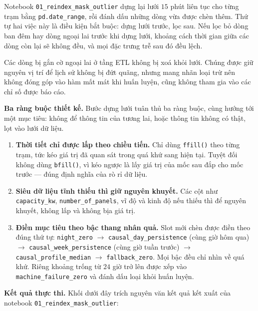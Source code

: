 Notebook \texttt{01\_reindex\_mask\_outlier} dựng lại lưới $15$ phút liên tục cho từng trạm
bằng \texttt{pd.date\_range}, rồi đánh dấu những dòng vừa được chèn thêm. Thứ tự hai
việc này là điều kiện bắt buộc: dựng lưới trước, lọc sau. Nếu lọc bỏ dòng ban
đêm hay dòng ngoại lai trước khi dựng lưới, khoảng cách thời gian giữa các dòng còn lại
sẽ không đều, và mọi đặc trưng trễ sau đó đều lệch.

Các dòng bị gắn cờ ngoại lai ở tầng ETL không bị xoá khỏi lưới. Chúng được giữ nguyên
vị trí để lịch sử không bị đứt quãng, nhưng mang nhãn loại trừ nên không đóng góp vào
hàm mất mát khi huấn luyện, cũng không tham gia vào các chỉ số được báo cáo.

\textbf{Ba ràng buộc thiết kế.} Bước dựng lưới tuân thủ ba ràng buộc, cùng hướng tới một
mục tiêu: không để thông tin của tương lai, hoặc thông tin không có thật, lọt vào lưới dữ liệu.

\begin{enumerate}
    \item \textbf{Thời tiết chỉ được lấp theo chiều tiến.} Chỉ dùng \texttt{ffill()} theo
    từng trạm, tức kéo giá trị đã quan sát trong quá khứ sang hiện tại. Tuyệt đối không
    dùng \texttt{bfill()}, vì kéo ngược là lấy giá trị của mốc sau đắp cho mốc trước --- đúng
    định nghĩa của rò rỉ dữ liệu.
    \item \textbf{Siêu dữ liệu tĩnh thiếu thì giữ nguyên khuyết.} Các cột như
    \texttt{capacity\_kw}, \texttt{number\_of\_panels}, vĩ độ và kinh độ nếu thiếu thì để nguyên
    khuyết, không lấp và không bịa giá trị.
    \item \textbf{Điền mục tiêu theo bậc thang nhân quả.} Slot mới chèn được điền theo đúng
    thứ tự: \texttt{night\_zero} $\rightarrow$ \texttt{causal\_day\_persistence} (cùng giờ hôm qua)
    $\rightarrow$ \texttt{causal\_week\_persistence} (cùng giờ tuần trước) $\rightarrow$
    \texttt{causal\_profile\_median} $\rightarrow$ \texttt{fallback\_zero}. Mọi bậc đều chỉ nhìn về
    quá khứ. Riêng khoảng trống từ $24$ giờ trở lên được xếp vào \texttt{machine\_failure\_zero}
    và đánh dấu loại khỏi huấn luyện.
\end{enumerate}

\textbf{Kết quả thực thi.} Khối dưới đây trích nguyên văn kết quả kết xuất của notebook
\texttt{01\_reindex\_mask\_outlier}:

